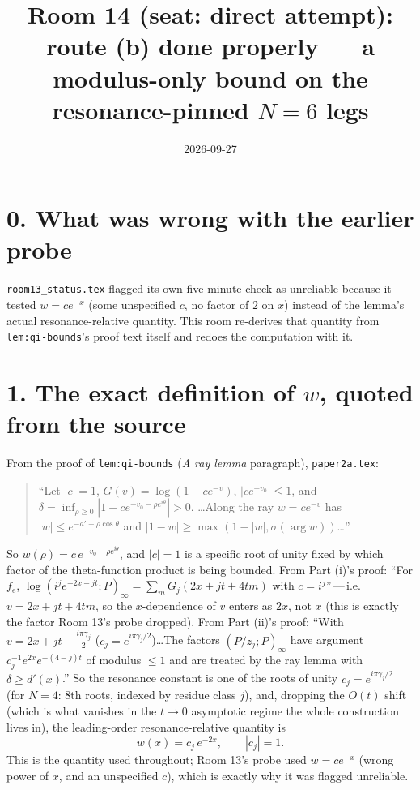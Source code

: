\documentclass[11pt]{article}
\title{Room 14 (seat: direct attempt): route (b) done properly ---
a modulus-only bound on the resonance-pinned $N=6$ legs}
\date{2026-09-27}
\begin{document}
\maketitle

\section*{0. What was wrong with the earlier probe}

\texttt{room13\_status.tex} flagged its own five-minute check as unreliable because it tested
$w=ce^{-x}$ (some unspecified $c$, no factor of $2$ on $x$) instead of the lemma's actual
resonance-relative quantity. This room re-derives that quantity from \texttt{lem:qi-bounds}'s proof
text itself and redoes the computation with it.

\section*{1. The exact definition of $w$, quoted from the source}

From the proof of \texttt{lem:qi-bounds} (\emph{A ray lemma} paragraph), \texttt{paper2a.tex}:
\begin{quote}
``Let $|c|=1$, $G(v)=\log(1-ce^{-v})$, $|ce^{-v_0}|\le1$, and
$\delta=\inf_{\rho\ge0}|1-ce^{-v_0-\rho e^{i\theta}}|>0$. \ldots Along the ray $w=ce^{-v}$ has
$|w|\le e^{-a'-\rho\cos\theta}$ and $|1-w|\ge\max(1-|w|,\sigma(\arg w))$\ldots''
\end{quote}
So $w(\rho)=c\,e^{-v_0-\rho e^{i\theta}}$, and $|c|=1$ is a specific root of unity fixed by which
factor of the theta-function product is being bounded. From Part (i)'s proof: ``For $f_e$,
$\log(i^je^{-2x-jt};P)_\infty=\sum_mG_j(2x+jt+4tm)$ with $c=i^j$''\,---\,i.e.\ $v=2x+jt+4tm$, so the
$x$-dependence of $v$ enters as $2x$, not $x$ (this is exactly the factor Room 13's probe dropped).
From Part (ii)'s proof: ``With $v=2x+jt-\frac{i\pi\gamma_j}2$ ($c_j=e^{i\pi\gamma_j/2}$)\ldots The
factors $(P/z_j;P)_\infty$ have argument $c_j^{-1}e^{2x}e^{-(4-j)t}$ of modulus $\le1$ and are
treated by the ray lemma with $\delta\ge d'(x)$.'' So the resonance constant is one of the roots of
unity $c_j=e^{i\pi\gamma_j/2}$ (for $N=4$: 8th roots, indexed by residue class $j$), and, dropping
the $O(t)$ shift (which is what vanishes in the $t\to0$ asymptotic regime the whole construction
lives in), the leading-order resonance-relative quantity is
\[
   w(x)=c_j\,e^{-2x},\qquad |c_j|=1.
\]
This is the quantity used throughout; Room 13's probe used $w=ce^{-x}$ (wrong power of $x$, and an
unspecified $c$), which is exactly why it was flagged unreliable.
\end{document}

